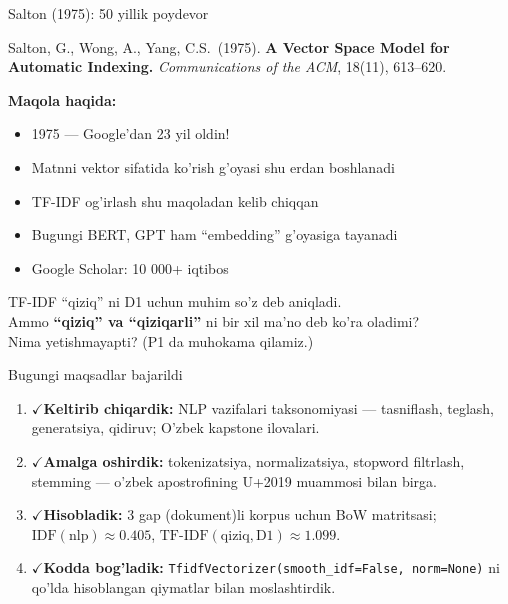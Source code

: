 \documentclass[aspectratio=169,11pt]{beamer}
\newcommand{\bajarildi}{{\color{deepgreen}\large$\checkmark$}\;}
\begin{document}
\begin{frame}{Salton (1975): 50 yillik poydevor}
  \begin{tcolorbox}[defbox,title=Seminal maqola]
    \small
    Salton, G., Wong, A., Yang, C.S.\ (1975).
    \textbf{A Vector Space Model for Automatic Indexing.}
    \textit{Communications of the ACM}, 18(11), 613--620.
  \end{tcolorbox}
  \vspace{5pt}
  \textbf{Maqola haqida:}
  \begin{itemize}\small\setlength\itemsep{3pt}
    \item 1975 --- Google'dan 23 yil oldin!
    \item Matnni vektor sifatida ko'rish g'oyasi shu erdan boshlanadi
    \item TF-IDF og'irlash shu maqoladan kelib chiqqan
    \item Bugungi BERT, GPT ham ``embedding'' g'oyasiga tayanadi
    \item Google Scholar: 10 000+ iqtibos
  \end{itemize}
  \vspace{5pt}
  \begin{tcolorbox}[warnbox,title=Keyingi darsga muhokama savoli]
    \small
    TF-IDF ``qiziq'' ni D1 uchun muhim so'z deb aniqladi.\\
    Ammo \textbf{``qiziq'' va ``qiziqarli''} ni bir xil ma'no deb ko'ra oladimi?\\
    Nima yetishmayapti? (P1 da muhokama qilamiz.)
  \end{tcolorbox}
\end{frame}

\begin{frame}{Bugungi maqsadlar bajarildi}
  \begin{enumerate}\setlength\itemsep{10pt}
    \item \bajarildi \textbf{Keltirib chiqardik:}
          NLP vazifalari taksonomiyasi --- tasniflash, teglash,
          generatsiya, qidiruv; O'zbek kapstone ilovalari.
    \item \bajarildi \textbf{Amalga oshirdik:}
          tokenizatsiya, normalizatsiya, stopword filtrlash, stemming ---
          o'zbek apostrofining U+2019 muammosi bilan birga.
    \item \bajarildi \textbf{Hisobladik:}
          3 gap (dokument)li korpus uchun BoW matritsasi;
          $\mathrm{IDF(nlp)}\approx 0.405$,
          $\mathrm{TF\text{-}IDF(qiziq,D1)}\approx 1.099$.
    \item \bajarildi \textbf{Kodda bog'ladik:}
          \texttt{TfidfVectorizer(smooth\_idf=False, norm=None)} ni
          qo'lda hisoblangan qiymatlar bilan moslashtirdik.
  \end{enumerate}
\end{frame}
\end{document}
